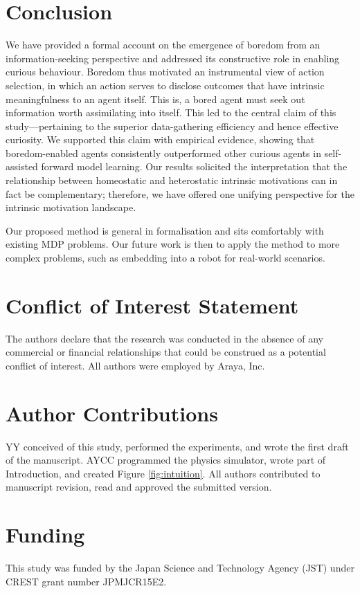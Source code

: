 \documentclass[utf8]{frontiersSCNS}
\begin{document}
\section{Conclusion}

We have provided a formal account on the emergence of boredom from an information-seeking perspective and addressed its constructive role in enabling curious behaviour. Boredom thus motivated an instrumental view of action selection, in which an action serves to disclose outcomes that have intrinsic meaningfulness to an agent itself. This is, a bored agent must seek out information worth assimilating into itself. This led to the central claim of this study---pertaining to the superior data-gathering efficiency and hence effective curiosity. We supported this claim with empirical evidence, showing that boredom-enabled agents consistently outperformed other curious agents in self-assisted forward model learning. Our results solicited the interpretation that the relationship between homeostatic and heterostatic intrinsic motivations can in fact be complementary; therefore, we have offered one unifying perspective for the intrinsic motivation landscape.

Our proposed method is general in formalisation and sits comfortably with existing MDP problems. Our future work is then to apply the method to more complex problems, such as embedding into a robot for real-world scenarios.

\section*{Conflict of Interest Statement}

The authors declare that the research was conducted in the absence of any commercial or financial relationships that could be construed as a potential conflict of interest. All authors were employed by Araya, Inc.

\section*{Author Contributions}
YY conceived of this study, performed the experiments, and wrote the first draft of the manuscript. AYCC programmed the physics simulator, wrote part of Introduction, and created Figure \ref{fig:intuition}. All authors contributed to manuscript revision, read and approved the submitted version.

\section*{Funding}
This study was funded by the Japan Science and Technology Agency (JST) under CREST grant number JPMJCR15E2.
\end{document}
